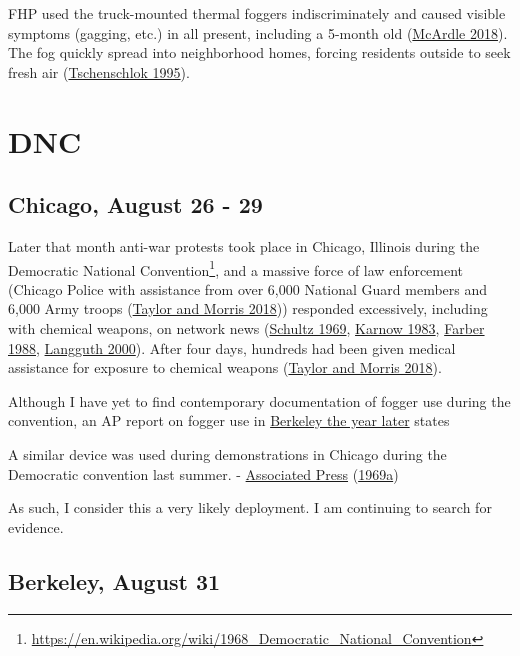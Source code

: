 \documentclass[
  11pt,
]{krantz}
\renewenvironment{quote}{\begin{VF}}{\end{VF}}
\renewcommand{\href}[2]{#2\footnote{\url{#1}}}
\begin{document}
FHP used the truck-mounted thermal foggers indiscriminately and caused visible symptoms (gagging, etc.) in all present, including a 5-month old (\protect\hyperlink{ref-McArdle2018}{McArdle 2018}).
The fog quickly spread into neighborhood homes, forcing residents outside to seek fresh air (\protect\hyperlink{ref-Tschenschlok1995}{Tschenschlok 1995}).

\hypertarget{dnc}{%
\section{DNC}\label{dnc}}

\hypertarget{ChicagoIL1968_08_26}{%
\subsection{Chicago, August 26 - 29}\label{ChicagoIL1968_08_26}}

Later that month anti-war protests took place in Chicago, Illinois during the \href{https://en.wikipedia.org/wiki/1968_Democratic_National_Convention}{Democratic National Convention}, and a massive force of law enforcement (Chicago Police with assistance from over 6,000 National Guard members and 6,000 Army troops (\protect\hyperlink{ref-TaylorandMorris2018}{Taylor and Morris 2018})) responded excessively, including with chemical weapons, on network news (\protect\hyperlink{ref-Schultz1969}{Schultz 1969}, \protect\hyperlink{ref-Karnow1983}{Karnow 1983}, \protect\hyperlink{ref-Farber1988}{Farber 1988}, \protect\hyperlink{ref-Langguth2000}{Langguth 2000}).
After four days, hundreds had been given medical assistance for exposure to chemical weapons (\protect\hyperlink{ref-TaylorandMorris2018}{Taylor and Morris 2018}).

Although I have yet to find contemporary documentation of fogger use during the convention, an AP report on fogger use in \protect\hyperlink{BerkeleyCA1969_02_21}{Berkeley the year later} states

\begin{quote}
A similar device was used during demonstrations in Chicago during the Democratic convention last summer. - \protect\hyperlink{ref-TheDailyTribune1969_02_21}{Associated Press} (\protect\hyperlink{ref-TheDailyTribune1969_02_21}{1969a})
\end{quote}

As such, I consider this a very likely deployment.
I am continuing to search for evidence.

\hypertarget{BerkeleyCA1968_08_31}{%
\subsection{Berkeley, August 31}\label{BerkeleyCA1968_08_31}}
\end{document}
